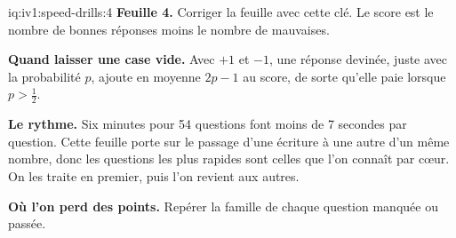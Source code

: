 \begin{solution}{iq:iv1:speed-drills:4}
\textbf{Feuille 4.} Corriger la feuille avec cette clé. Le score est le nombre de bonnes réponses moins le nombre de mauvaises.
\par\nopagebreak


\textbf{Quand laisser une case vide.} Avec $+1$ et $-1$, une réponse devinée, juste avec la probabilité $p$, ajoute en moyenne $2p - 1$ au score, de sorte qu'elle paie lorsque $p > \tfrac12$.

\textbf{Le rythme.} Six minutes pour 54 questions font moins de 7 secondes par question. Cette feuille porte sur le passage d'une écriture à une autre d'un même nombre, donc les questions les plus rapides sont celles que l'on connaît par cœur. On les traite en premier, puis l'on revient aux autres.

\textbf{Où l'on perd des points.} Repérer la famille de chaque question manquée ou passée.


\end{solution}

